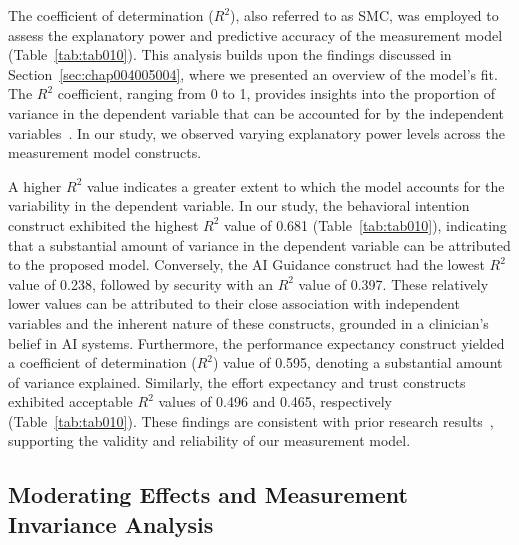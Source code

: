 

The coefficient of determination ($R^2$), also referred to as \ac{SMC}, was employed to assess the explanatory power and predictive accuracy of the measurement model (Table~\ref{tab:tab010}).
This analysis builds upon the findings discussed in Section~\ref{sec:chap004005004}, where we presented an overview of the model's fit.
The $R^2$ coefficient, ranging from 0 to 1, provides insights into the proportion of variance in the dependent variable that can be accounted for by the independent variables~\cite{doi:10.1080/10705511.2017.1401932}.
In our study, we observed varying explanatory power levels across the measurement model constructs.

A higher $R^2$ value indicates a greater extent to which the model accounts for the variability in the dependent variable.
In our study, the behavioral intention construct exhibited the highest $R^2$ value of 0.681 (Table~\ref{tab:tab010}), indicating that a substantial amount of variance in the dependent variable can be attributed to the proposed model.
Conversely, the \ac{AI} Guidance construct had the lowest $R^2$ value of 0.238, followed by security with an $R^2$ value of 0.397. These relatively lower values can be attributed to their close association with independent variables and the inherent nature of these constructs, grounded in a clinician's belief in \ac{AI} systems.
Furthermore, the performance expectancy construct yielded a coefficient of determination ($R^2$) value of 0.595, denoting a substantial amount of variance explained.
Similarly, the effort expectancy and trust constructs exhibited acceptable $R^2$ values of 0.496 and 0.465, respectively (Table~\ref{tab:tab010}).
These findings are consistent with prior research results~\cite{KHALILZADEH2017460}, supporting the validity and reliability of our measurement model.



\subsection{Moderating Effects and Measurement Invariance Analysis}
\label{chap:app002004005}

